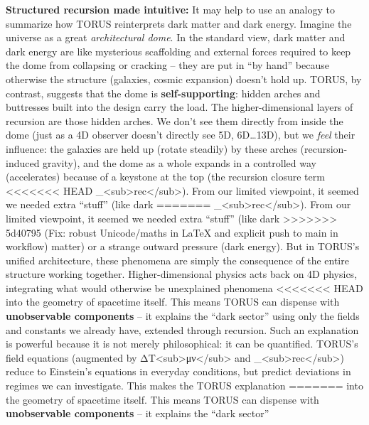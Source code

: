 \documentclass[]{article}
\begin{document}
\textbf{Structured recursion made intuitive:} It may help to use an
analogy to summarize how TORUS reinterprets dark matter and dark energy.
Imagine the universe as a great \emph{architectural dome}. In the
standard view, dark matter and dark energy are like mysterious
scaffolding and external forces required to keep the dome from
collapsing or cracking -- they are put in ``by hand'' because otherwise
the structure (galaxies, cosmic expansion) doesn't hold up. TORUS, by
contrast, suggests that the dome is \textbf{self-supporting}: hidden
arches and buttresses built into the design carry the load. The
higher-dimensional layers of recursion are those hidden arches. We don't
see them directly from inside the dome (just as a 4D observer doesn't
directly see 5D, 6D\ldots{}13D), but we \emph{feel} their influence: the
galaxies are held up (rotate steadily) by these arches
(recursion-induced gravity), and the dome as a whole expands in a
controlled way (accelerates) because of a keystone at the top (the
recursion closure term
<<<<<<< HEAD
\Lambda\_\textless sub\textgreater rec\textless/sub\textgreater). From our
limited viewpoint, it seemed we needed extra ``stuff'' (like dark
=======
\Lambda\_\textless{}sub\textgreater{}rec\textless{}/sub\textgreater{}). From
our limited viewpoint, it seemed we needed extra ``stuff'' (like dark
>>>>>>> 5d40795 (Fix: robust Unicode/maths in LaTeX and explicit push to main in workflow)
matter) or a strange outward pressure (dark energy). But in TORUS's
unified architecture, these phenomena are simply the consequence of the
entire structure working together. Higher-dimensional physics acts back
on 4D physics, integrating what would otherwise be unexplained phenomena
<<<<<<< HEAD
into the geometry of spacetime itself\hspace{0pt}. This means TORUS can
dispense with \textbf{unobservable components} -- it explains the ``dark
sector'' using only the fields and constants we already have, extended
through recursion. Such an explanation is powerful because it is not
merely philosophical: it can be quantified. TORUS's field equations
(augmented by ΔT\textless sub\textgreater μν\textless/sub\textgreater{}
and \Lambda\_\textless sub\textgreater rec\textless/sub\textgreater) reduce to
Einstein's equations in everyday conditions, but predict deviations in
regimes we can investigate\hspace{0pt}. This makes the TORUS explanation
=======
into the geometry of spacetime itself​. This means TORUS can dispense
with \textbf{unobservable components} -- it explains the ``dark sector''
\end{document}
